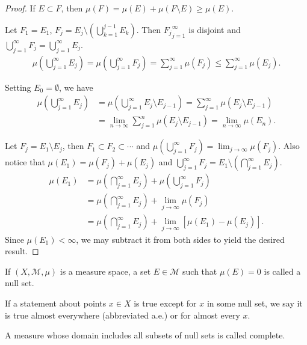 \begin{proof}
If $E \subset F$, then $\mu(F) = \mu(E) + \mu(F \setminus E) \ge \mu(E)$.

Let $F_1 = E_1$, $F_j = E_j \setminus (\bigcup_{k=1}^{j-1} E_k)$.
Then ${F_j}_{j=1}^{\infty}$ is disjoint and $\bigcup_{j=1}^{\infty} F_j = \bigcup_{j=1}^{\infty} E_j$.
\begin{align}
\mu( \bigcup_{j=1}^{\infty} E_j) = \mu( \bigcup_{j=1}^{\infty} F_j ) = \sum_{j=1}^{\infty} \mu(F_j) \le \sum_{j=1}^{\infty} \mu(E_j).
\end{align}

Setting $E_0 = \emptyset$, we have
\begin{align}
\mu( \bigcup_{j=1}^{\infty} E_j) &= \mu( \bigcup_{j=1}^{\infty} E_j \setminus E_{j-1}) = \sum_{j=1}^{\infty} \mu(E_j \setminus E_{j-1}) \\
&= \lim_{n \to \infty} \sum_{j=1}^{n} \mu(E_j \setminus E_{j-1}) = \lim_{n \to \infty} \mu(E_n).
\end{align}

Let $F_j = E_1 \setminus E_j$, then $F_1 \subset F_2 \subset \cdots$ and $\mu(\bigcup_{j=1}^{\infty} F_j) = \lim_{j\to \infty} \mu(F_j)$.
Also notice that $\mu(E_1) = \mu(F_j) + \mu(E_j)$ and $\bigcup_{j=1}^{\infty} F_j = E_1 \setminus \left( \bigcap_{j=1}^{\infty} E_j \right)$.
\begin{align}
\mu(E_1) &= \mu( \bigcap_{j=1}^{\infty} E_j ) + \mu(\bigcup_{j=1}^{\infty} F_j) \\
&= \mu( \bigcap_{j=1}^{\infty} E_j ) + \lim_{j\to \infty} \mu(F_j) \\
&= \mu( \bigcap_{j=1}^{\infty} E_j ) + \lim_{j\to \infty} [\mu(E_1) - \mu(E_j)].
\end{align}
Since $\mu(E_1) < \infty$, we may subtract it from both sides to yield the desired result. 
\end{proof}

\begin{definition}
If $(X, \mathcal{M}, \mu)$ is a measure space, a set $E \in \mathcal{M}$ such that $\mu(E) = 0$ is called a null set.
\end{definition}

\begin{definition}
If a statement about points $x \in X$ is true except for $x$ in some null set, we say it is true almost everywhere (abbreviated a.e.) or for almost every $x$.
\end{definition}

\begin{definition}
A measure whose domain includes all subsets of null sets is called complete.
\end{definition}

